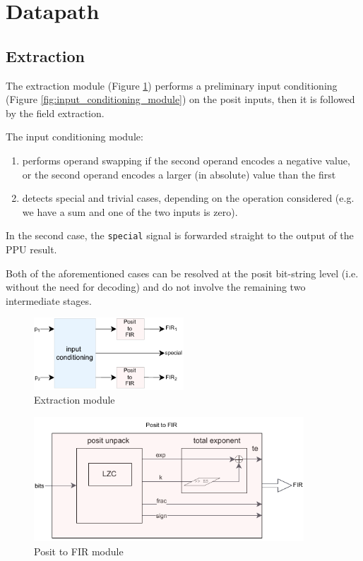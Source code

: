 \section{Datapath}

\subsection{Extraction}\label{sec:posit_extraction}

The extraction module (Figure \ref{fig:extraction_ppu}) performs a preliminary input conditioning (Figure \ref{fig:input_conditioning_module}) on the posit inputs, then it is followed by the field extraction.

The input conditioning module:
\begin{enumerate}
    \item performs operand swapping if the second operand encodes a negative value, or the second operand encodes a larger (in absolute) value than the first 
    \item detects special and trivial cases, depending on the operation considered (e.g. we have a sum and one of the two inputs is zero).
\end{enumerate} 

In the second case, the \texttt{special} signal is forwarded straight to the output of the PPU result. 

Both of the aforementioned cases can be resolved at the posit bit-string level (i.e. without the need for decoding) and do not involve the remaining two intermediate stages.

\begin{figure}
    \centering
    \includegraphics[width=0.5\textwidth]{figures/extraction.drawio.pdf}
    \caption{Extraction module}
    \label{fig:extraction_ppu}
\end{figure}

\begin{figure}
    \centering
    \includegraphics[width=0.9\textwidth]{figures/posit2fir.drawio.pdf}
    \caption{Posit to FIR module}
    \label{fig:posit2fir_ppu}
\end{figure}






